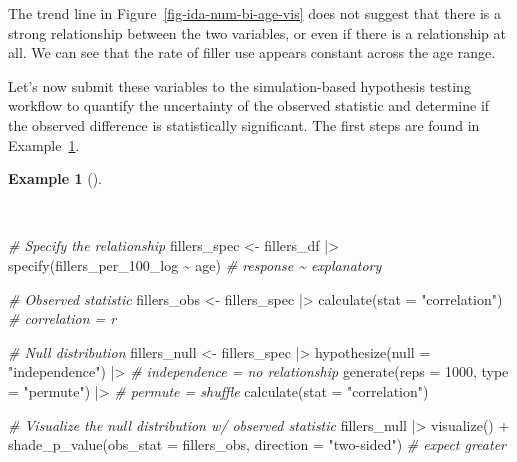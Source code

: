 \documentclass[
  letterpaper,
  DIV=11,
  numbers=noendperiod]{scrreprt}
\newenvironment{Shaded}{\begin{snugshade}}{\end{snugshade}}
\newcommand{\AttributeTok}[1]{\textcolor[rgb]{0.00,0.00,0.00}{#1}}
\newcommand{\CommentTok}[1]{\textcolor[rgb]{0.00,0.00,0.00}{\textit{#1}}}
\newcommand{\DecValTok}[1]{\textcolor[rgb]{0.00,0.00,0.00}{#1}}
\newcommand{\FunctionTok}[1]{\textcolor[rgb]{0.00,0.00,0.00}{#1}}
\newcommand{\NormalTok}[1]{\textcolor[rgb]{0.00,0.00,0.00}{#1}}
\newcommand{\OtherTok}[1]{\textcolor[rgb]{0.00,0.00,0.00}{#1}}
\newcommand{\SpecialCharTok}[1]{\textcolor[rgb]{0.00,0.00,0.00}{#1}}
\newcommand{\StringTok}[1]{\textcolor[rgb]{0.00,0.00,0.00}{#1}}
\theoremstyle{definition}
\newtheorem{example}{Example}[chapter]
\theoremstyle{remark}
\begin{document}
The trend line in Figure~\ref{fig-ida-num-bi-age-vis} does not suggest
that there is a strong relationship between the two variables, or even
if there is a relationship at all. We can see that the rate of filler
use appears constant across the age range.

Let's now submit these variables to the simulation-based hypothesis
testing workflow to quantify the uncertainty of the observed statistic
and determine if the observed difference is statistically significant.
The first steps are found in Example~\ref{exm-ida-num-bi-age-null}.

\begin{example}[]\protect\hypertarget{exm-ida-num-bi-age-null}{}\label{exm-ida-num-bi-age-null}

~

\begin{Shaded}
\begin{Highlighting}[]
\CommentTok{\# Specify the relationship}
\NormalTok{fillers\_spec }\OtherTok{\textless{}{-}}
\NormalTok{  fillers\_df }\SpecialCharTok{|\textgreater{}}
  \FunctionTok{specify}\NormalTok{(fillers\_per\_100\_log }\SpecialCharTok{\textasciitilde{}}\NormalTok{ age) }\CommentTok{\# response \textasciitilde{} explanatory}

\CommentTok{\# Observed statistic}
\NormalTok{fillers\_obs }\OtherTok{\textless{}{-}}
\NormalTok{  fillers\_spec }\SpecialCharTok{|\textgreater{}}
  \FunctionTok{calculate}\NormalTok{(}\AttributeTok{stat =} \StringTok{"correlation"}\NormalTok{) }\CommentTok{\# correlation = r}

\CommentTok{\# Null distribution}
\NormalTok{fillers\_null }\OtherTok{\textless{}{-}}
\NormalTok{  fillers\_spec }\SpecialCharTok{|\textgreater{}}
  \FunctionTok{hypothesize}\NormalTok{(}\AttributeTok{null =} \StringTok{"independence"}\NormalTok{) }\SpecialCharTok{|\textgreater{}} \CommentTok{\# independence = no relationship}
  \FunctionTok{generate}\NormalTok{(}\AttributeTok{reps =} \DecValTok{1000}\NormalTok{, }\AttributeTok{type =} \StringTok{"permute"}\NormalTok{) }\SpecialCharTok{|\textgreater{}} \CommentTok{\# permute = shuffle}
  \FunctionTok{calculate}\NormalTok{(}\AttributeTok{stat =} \StringTok{"correlation"}\NormalTok{)}

\CommentTok{\# Visualize the null distribution w/ observed statistic}
\NormalTok{fillers\_null }\SpecialCharTok{|\textgreater{}}
  \FunctionTok{visualize}\NormalTok{() }\SpecialCharTok{+}
  \FunctionTok{shade\_p\_value}\NormalTok{(}\AttributeTok{obs\_stat =}\NormalTok{ fillers\_obs, }\AttributeTok{direction =} \StringTok{"two{-}sided"}\NormalTok{) }\CommentTok{\# expect greater}


\end{Highlighting}
\end{Shaded}
\end{example}
\end{document}
